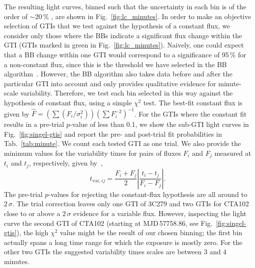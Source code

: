 \documentclass[twocolumn,linenumbers]{aastex62}
\begin{document}
The resulting light curves, binned such that the uncertainty in each bin is of the order of $\sim20\,\%$ \citep[using the adaptive binning introduced by][]{lott2012}, are shown in Fig.~\ref{fig:lc_minutes}. 
In order to make an objective selection of GTIs that we test against the hypothesis of a constant flux, we consider only those where the BBs indicate a significant flux change within the GTI (GTIs marked in green in Fig.~\ref{fig:lc_minutes}).
Naively, one could expect that a BB change within one GTI would correspond to a significance of 95\,\% for a non-constant flux, since this is the threshold we have selected in the BB algorithm~\citep{2013ApJ...764..167S}. However, the BB algorithm also takes data before and after the particular GTI into account and only provides qualitative evidence for minute-scale variability. 
Therefore, we test each bin selected in this way against the hypothesis of constant flux, using a simple $\chi^2$ test. 
The best-fit constant flux is given by $\hat{F} = (\sum (F_i / \sigma_i^2))(\sum F_i^{-2})^{-1}$. 
For the GTIs where the constant fit results in a pre-trial $p$-value of less than 0.1, we show the sub-GTI light curves in Fig.~\ref{fig:singel-gtis} and report the pre- and post-trial fit probabilities in Tab.~\ref{tab:minute}.
We count each tested GTI as one trial. 
We also provide the minimum values for the variability times for pairs of fluxes $F_i$ and $F_j$ measured at $t_i$ and $t_j$, respectively, given by~\citet{1999ApJ...527..719Z},
\begin{equation}
t_{\mathrm{var},ij} = \frac{F_i + F_j}{2}\left|\frac{t_i - t_j}{F_i - F_j}\right|.
\end{equation}
The pre-trial $p$-values for rejecting the constant-flux hypothesis are all around to $2\,\sigma$. 
The trial correction leaves only one GTI of 3C279 and two GTIs for CTA102 close to or above a $2\,\sigma$ evidence for a variable flux. 
However, inspecting the light curve the second GTI of CTA102 (starting at MJD\,57758.86, see Fig.~\ref{fig:singel-gtis}), the high $\chi^2$ value might be the result of our chosen binning; the first bin actually spans a long time range for which the exposure is mostly zero.  
For the other two GTIs the suggested variability times scales are between 3 and 4\,minutes.
\end{document}
